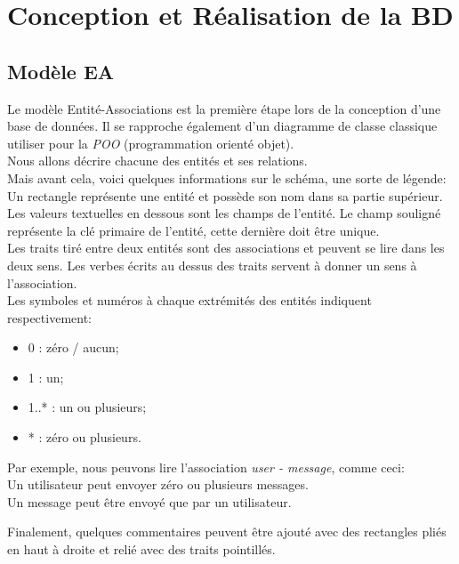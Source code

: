\documentclass[
    iai, %
    il, %
]{heig-tb}
\begin{document}
\chapter{Conception et Réalisation de la BD}

\section{Modèle EA}
Le modèle Entité-Associations est la première étape lors de la conception d'une base de données. Il se rapproche également d'un diagramme de classe classique utiliser pour la \emph{POO} (programmation orienté objet).\\
Nous allons décrire chacune des entités et ses relations.\\
Mais avant cela, voici quelques informations sur le schéma, une sorte de légende:\\
Un rectangle représente une entité et possède son nom dans sa partie supérieur.\\
Les valeurs textuelles en dessous sont les champs de l'entité. Le champ souligné représente la clé primaire de l'entité, cette dernière doit être unique.\\
Les traits tiré entre deux entités sont des associations et peuvent se lire dans les deux sens. Les verbes écrits au dessus des traits servent à donner un sens à l'association.\\
Les symboles et numéros à chaque extrémités des entités indiquent respectivement:
\begin{itemize}
    \item 0 : zéro / aucun;
    \item 1 : un;
    \item 1..* : un ou plusieurs;
    \item * : zéro ou plusieurs.
\end{itemize}

Par exemple, nous peuvons lire l'association \emph{user - message}, comme ceci:\\
Un utilisateur peut envoyer zéro ou plusieurs messages.\\
Un message peut être envoyé que par un utilisateur.

Finalement, quelques commentaires peuvent être ajouté avec des rectangles pliés en haut à droite et relié avec des traits pointillés.
\end{document}
